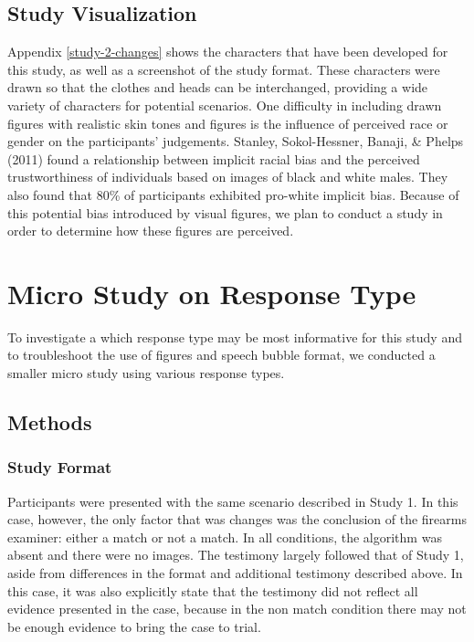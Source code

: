 \documentclass[print]{nuthesis}
\begin{document}
\hypertarget{study-visualization}{%
\subsection{Study Visualization}\label{study-visualization}}

Appendix \ref{study-2-changes} shows the characters that have been developed for this study, as well as a screenshot of the study format.
These characters were drawn so that the clothes and heads can be interchanged, providing a wide variety of characters for potential scenarios.
One difficulty in including drawn figures with realistic skin tones and figures is the influence of perceived race or gender on the participants' judgements.
Stanley, Sokol-Hessner, Banaji, \& Phelps (2011) found a relationship between implicit racial bias and the perceived trustworthiness of individuals based on images of black and white males.
They also found that 80\% of participants exhibited pro-white implicit bias.
Because of this potential bias introduced by visual figures, we plan to conduct a study in order to determine how these figures are perceived.

\hypertarget{micro-study-on-response-type}{%
\section{Micro Study on Response Type}\label{micro-study-on-response-type}}

To investigate a which response type may be most informative for this study and to troubleshoot the use of figures and speech bubble format, we conducted a smaller micro study using various response types.

\hypertarget{methods-2}{%
\subsection{Methods}\label{methods-2}}

\hypertarget{study-format-1}{%
\subsubsection{Study Format}\label{study-format-1}}

Participants were presented with the same scenario described in Study 1.
In this case, however, the only factor that was changes was the conclusion of the firearms examiner: either a match or not a match.
In all conditions, the algorithm was absent and there were no images.
The testimony largely followed that of Study 1, aside from differences in the format and additional testimony described above.
In this case, it was also explicitly state that the testimony did not reflect all evidence presented in the case, because in the non match condition there may not be enough evidence to bring the case to trial.
\end{document}
